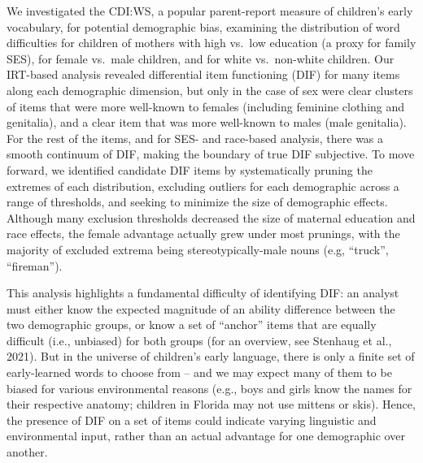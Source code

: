 \documentclass[10pt, letterpaper]{article}
\begin{document}
We investigated the CDI:WS, a popular parent-report measure of
children's early vocabulary, for potential demographic bias, examining
the distribution of word difficulties for children of mothers with high
vs.~low education (a proxy for family SES), for female vs.~male
children, and for white vs.~non-white children. Our IRT-based analysis
revealed differential item functioning (DIF) for many items along each
demographic dimension, but only in the case of sex were clear clusters
of items that were more well-known to females (including feminine
clothing and genitalia), and a clear item that was more well-known to
males (male genitalia). For the rest of the items, and for SES- and
race-based analysis, there was a smooth continuum of DIF, making the
boundary of true DIF subjective. To move forward, we identified
candidate DIF items by systematically pruning the extremes of each
distribution, excluding outliers for each demographic across a range of
thresholds, and seeking to minimize the size of demographic effects.
Although many exclusion thresholds decreased the size of maternal
education and race effects, the female advantage actually grew under
most prunings, with the majority of excluded extrema being
stereotypically-male nouns (e.g, ``truck'', ``fireman'').

This analysis highlights a fundamental difficulty of identifying DIF: an
analyst must either know the expected magnitude of an ability difference
between the two demographic groups, or know a set of ``anchor'' items
that are equally difficult (i.e., unbiased) for both groups (for an
overview, see Stenhaug et al., 2021). But in the universe of children's
early language, there is only a finite set of early-learned words to
choose from -- and we may expect many of them to be biased for various
environmental reasons (e.g., boys and girls know the names for their
respective anatomy; children in Florida may not use mittens or skis).
Hence, the presence of DIF on a set of items could indicate varying
linguistic and environmental input, rather than an actual advantage for
one demographic over another.
\end{document}
